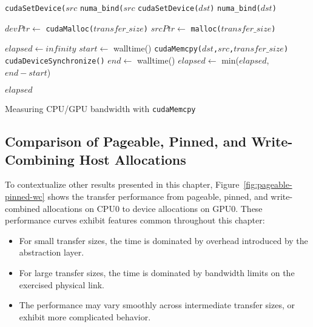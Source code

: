 \begin{algorithm}

    \begin{algorithmic}[1]
    \Statex
            \State \texttt{cudaSetDevice($src$}
        \Else {}
            \State \texttt{numa\_bind($src$}
        \EndIf
        \State \texttt{cudaSetDevice($dst$)}
        \Else {}
        \State \texttt{numa\_bind($dst$)}
        \EndIf

        \State $devPtr \gets$ \texttt{cudaMalloc($transfer\_size$)} 
        \State $srcPtr \gets$ \texttt{malloc($transfer\_size$)} 

        \State $elapsed \gets infinity$ 
            \State $start \gets$ walltime()
            \State \texttt{cudaMemcpy($dst$,$src$,$transfer\_size$)}
            \State \texttt{cudaDeviceSynchronize()}
            \State $end \gets$ walltime()
            \State $elapsed \gets$ min($elapsed$, $end-start$)
        \EndFor

        \Return $elapsed$
    \EndFunction

    \end{algorithmic}
    \caption[Measuring CPU/GPU bandwidth with \texttt{cudaMemcpy}]{
        Measuring CPU/GPU bandwidth with \texttt{cudaMemcpy}
    }
    \label{alg:explicit}
\end{algorithm}

\subsection{Comparison of Pageable, Pinned, and Write-Combining Host Allocations}
\label{sec:explicit-pageable-pinned-wc}

To contextualize other results presented in this chapter, Figure~\ref{fig:pageable-pinned-wc} shows the transfer performance from pageable, pinned, and write-combined allocations on CPU0 to device allocations on GPU0.
These performance curves exhibit features common throughout this chapter:
\begin{itemize}
\item For small transfer sizes, the time is dominated by overhead introduced by the abstraction layer.
\item For large transfer sizes, the time is dominated by bandwidth limits on the exercised physical link.
\item The performance may vary smoothly across intermediate transfer sizes, or exhibit more complicated behavior.
\end{itemize}

